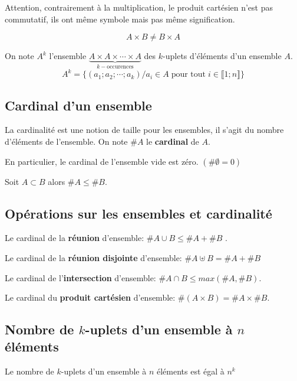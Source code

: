 \documentclass[french]{book}
\newcommand{\ie}{\leq}
\begin{document}
\begin{rem}
Attention, contrairement à la multiplication, le produit cartésien n'est pas commutatif, ils ont même symbole mais pas même signification. 

$$A \times B \neq B \times A$$ 
\end{rem}

\begin{defn}
On note $A^k$ l'ensemble $\underbrace{ A \times A \times \cdots  \times A }_{k-\text{occurences}} $ des $k$-uplets d’éléments d’un ensemble $A$. \\

$$ A^k=\{(a_1;a_2;\cdots;a_k)/ a_i \in A \; \text{pour tout} \; i\in \llbracket 1;n \rrbracket \} $$
\end{defn}

\subsection{Cardinal d'un ensemble}
\begin{defn}
La cardinalité est une notion de taille pour les ensembles, il s'agit du nombre d'éléments de l'ensemble. On note $\#A$ le \textbf{cardinal} de $A$.
\end{defn}

\begin{rem}
En particulier, le cardinal de l'ensemble vide est zéro. $(\#\emptyset =0)$
\end{rem}

\begin{prop}
Soit $A\subset B$ alors $\#A \ie \#B$.
\end{prop}

\subsection{Opérations sur les ensembles et cardinalité}
\begin{prop}
Le cardinal de la \textbf{réunion} d'ensemble: $ \# A\cup B \ie \#A +\#B$ .
\par Le cardinal de la \textbf{réunion disjointe} d'ensemble: $ \# A\uplus B = \#A +\#B$
\par Le cardinal de l'\textbf{intersection} d'ensemble: $ \# A\cap B \ie max(\#A,\#B)$.
\par Le cardinal du \textbf{produit cartésien} d'ensemble: $\# (A\times B)= \#A \times \#B$.
\end{prop}

\subsection{Nombre de $k$-uplets d'un ensemble à $n$ éléments}
\begin{prop}
Le nombre  de $k$-uplets d'un ensemble à $n$ éléments est égal à $n^k$ 
\end{prop}
\end{document}
